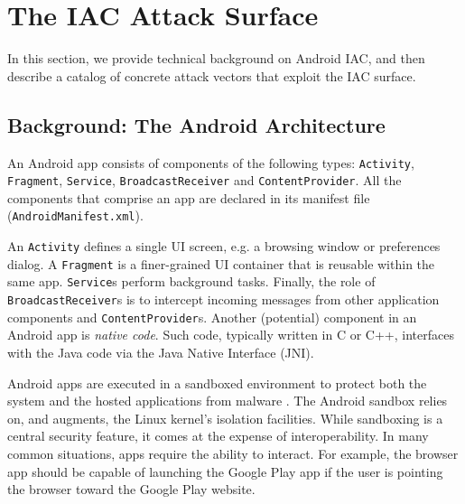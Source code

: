 \section{The IAC Attack Surface}\label{Se:surface}

In this section, we provide technical background on Android IAC, and then describe a catalog of concrete attack vectors that exploit the IAC surface.

\subsection{Background: The Android Architecture}\label{Se:andarchitecture}

An Android app consists of components of the following types:
{\tt Activity}, {\tt Fragment}, {\tt Service},
{\tt BroadcastReceiver} and {\tt ContentProvider}. 
%
All the components that comprise  an app 
are declared in its manifest
file (\texttt{AndroidManifest.xml}).

An {\tt Activity}
defines a single UI screen, e.g. a browsing window or preferences dialog. A {\tt Fragment} is
a finer-grained UI container that is reusable within the same app. {\tt Service}s perform background tasks. Finally, the role of {\tt BroadcastReceiver}s is to intercept incoming messages from other application components and {\tt ContentProvider}s.
%
Another (potential) component in an Android app is \textit{native code}. Such code,
typically written in C or C++, interfaces with the Java code via the Java Native Interface (JNI).

Android apps are executed in a sandboxed environment
to protect both the system and the hosted applications from
malware \cite{EOM:SP09}. 
%
%
The Android sandbox relies on, and augments, the Linux kernel's isolation
facilities.
%
%
While sandboxing is a central security feature, it comes at the expense of interoperability. In many common situations, apps require the ability to interact. For example, the browser app should be capable of launching the Google Play app if the user is pointing the browser toward the Google Play website. 

